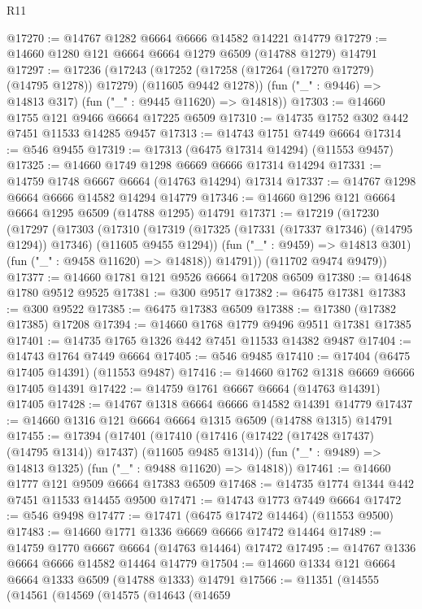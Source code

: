 \begin{lexlean}{R11}
\begin{coremodule}
{{{{{{{{{{{{{{{{{{{{{{{{{{{{{{{{{{{{{{{{{{{{{{{{{{{{{{{{{{{{{{{{{{{{{{{{{{{{{{{{{{@17270 := @14767 @1282 @6664 @6666 @14582 @14221 @14779
@17279 := @14660 @1280 @121 @6664 @6664 @1279 @6509 (@14788 @1279) @14791
@17297 := @17236
    (@17243
      (@17252 (@17258 (@17264 (@17270 @17279) (@14795 @1278)) @17279) (@11605 @9442 @1278))
      (fun ("_" : @9446) => @14813 @317)
      (fun ("_" : @9445 @11620) => @14818))
@17303 := @14660 @1755 @121 @9466 @6664 @17225 @6509
@17310 := @14735 @1752 @302 @442 @7451 @11533 @14285 @9457
@17313 := @14743 @1751 @7449 @6664
@17314 := @546 @9455
@17319 := @17313 (@6475 @17314 @14294) (@11553 @9457)
@17325 := @14660 @1749 @1298 @6669 @6666 @17314 @14294
@17331 := @14759 @1748 @6667 @6664 (@14763 @14294) @17314
@17337 := @14767 @1298 @6664 @6666 @14582 @14294 @14779
@17346 := @14660 @1296 @121 @6664 @6664 @1295 @6509 (@14788 @1295) @14791
@17371 := @17219
    (@17230
      (@17297
        (@17303
          (@17310
            (@17319 (@17325 (@17331 (@17337 @17346) (@14795 @1294)) @17346) (@11605 @9455 @1294))
            (fun ("_" : @9459) => @14813 @301)
            (fun ("_" : @9458 @11620) => @14818))
          @14791))
      (@11702 @9474 @9479))
@17377 := @14660 @1781 @121 @9526 @6664 @17208 @6509
@17380 := @14648 @1780 @9512 @9525
@17381 := @300 @9517
@17382 := @6475 @17381
@17383 := @300 @9522
@17385 := @6475 @17383 @6509
@17388 := @17380 (@17382 @17385) @17208
@17394 := @14660 @1768 @1779 @9496 @9511 @17381 @17385
@17401 := @14735 @1765 @1326 @442 @7451 @11533 @14382 @9487
@17404 := @14743 @1764 @7449 @6664
@17405 := @546 @9485
@17410 := @17404 (@6475 @17405 @14391) (@11553 @9487)
@17416 := @14660 @1762 @1318 @6669 @6666 @17405 @14391
@17422 := @14759 @1761 @6667 @6664 (@14763 @14391) @17405
@17428 := @14767 @1318 @6664 @6666 @14582 @14391 @14779
@17437 := @14660 @1316 @121 @6664 @6664 @1315 @6509 (@14788 @1315) @14791
@17455 := @17394
    (@17401
      (@17410 (@17416 (@17422 (@17428 @17437) (@14795 @1314)) @17437) (@11605 @9485 @1314))
      (fun ("_" : @9489) => @14813 @1325)
      (fun ("_" : @9488 @11620) => @14818))
@17461 := @14660 @1777 @121 @9509 @6664 @17383 @6509
@17468 := @14735 @1774 @1344 @442 @7451 @11533 @14455 @9500
@17471 := @14743 @1773 @7449 @6664
@17472 := @546 @9498
@17477 := @17471 (@6475 @17472 @14464) (@11553 @9500)
@17483 := @14660 @1771 @1336 @6669 @6666 @17472 @14464
@17489 := @14759 @1770 @6667 @6664 (@14763 @14464) @17472
@17495 := @14767 @1336 @6664 @6666 @14582 @14464 @14779
@17504 := @14660 @1334 @121 @6664 @6664 @1333 @6509 (@14788 @1333) @14791
@17566 := @11351
    (@14555
      (@14561
        (@14569
          (@14575
            (@14643
              (@14659
}}}}}}}}}}}}}}}}}}}}}}}}}}}}}}}}}}}}}}}}}}}}}}}}}}}}}}}}}}}}}}}}}}}}}}}}}}}}}}}}}}
\end{coremodule}
\end{lexlean}
